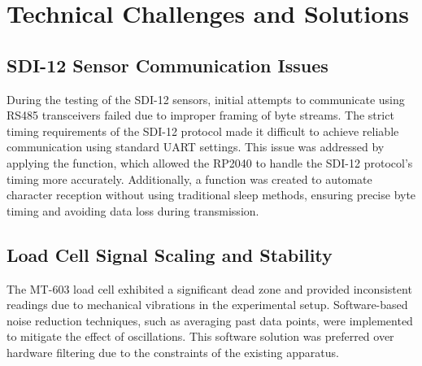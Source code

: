 \section{Technical Challenges and Solutions}

\subsection{SDI-12 Sensor Communication Issues}
During the testing of the SDI-12 sensors, initial attempts to communicate using RS485 transceivers failed due to improper framing of byte streams. The strict timing requirements of the SDI-12 protocol made it difficult to achieve reliable communication using standard UART settings. This issue was addressed by applying the  function, which allowed the RP2040 to handle the SDI-12 protocol's timing more accurately. Additionally, a  function was created to automate character reception without using traditional sleep methods, ensuring precise byte timing and avoiding data loss during transmission.

\subsection{Load Cell Signal Scaling and Stability}
The MT-603 load cell exhibited a significant dead zone and provided inconsistent readings due to mechanical vibrations in the experimental setup. Software-based noise reduction techniques, such as averaging past data points, were implemented to mitigate the effect of oscillations. This software solution was preferred over hardware filtering due to the constraints of the existing apparatus.

